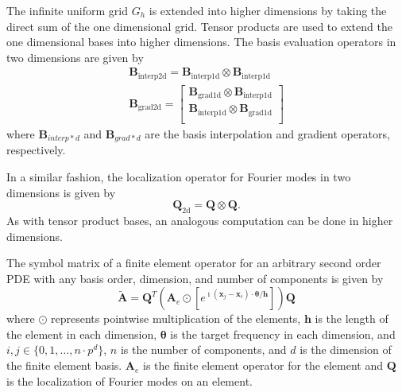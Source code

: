 \documentclass[review]{siamart190516}
\begin{document}
The infinite uniform grid $G_h$ is extended into higher dimensions by taking the direct sum of the one dimensional grid.
Tensor products are used to extend the one dimensional bases into higher dimensions.
The basis evaluation operators in two dimensions are given by
\begin{equation}
\begin{split}
\mathbf{B}_{\text{interp2d}} = \mathbf{B}_{\text{interp1d}} \otimes \mathbf{B}_{\text{interp1d}} \\
\mathbf{B}_{\text{grad2d}} =
\begin{bmatrix}
    \mathbf{B}_{\text{grad1d}} \otimes \mathbf{B}_{\text{interp1d}} \\
    \mathbf{B}_{\text{interp1d}} \otimes \mathbf{B}_{\text{grad1d}} \\
\end{bmatrix}
\end{split}
\end{equation}
where $\mathbf{B}_{interp*d}$ and $\mathbf{B}_{grad*d}$ are the basis interpolation and gradient operators, respectively.

In a similar fashion, the localization operator for Fourier modes in two dimensions is given by
\begin{equation}
\mathbf{Q}_{\text{2d}} = \mathbf{Q} \otimes \mathbf{Q}.
\end{equation}
As with tensor product bases, an analogous computation can be done in higher dimensions.

\begin{definition}
The symbol matrix of a finite element operator for an arbitrary second order PDE with any basis order, dimension, and number of components is given by
\begin{equation}\label{symbolhighorder}
\tilde{\mathbf{A}} = \mathbf{Q}^T \left( \mathbf{A}_e \odot \left[ e^{\imath \left( \mathbf{x}_j - \mathbf{x}_i \right) \cdot \boldsymbol{\theta} / \mathbf{h}} \right] \right) \mathbf{Q}
\end{equation}
where $\odot$ represents pointwise multiplication of the elements, $\mathbf{h}$ is the length of the element in each dimension, $\boldsymbol{\theta}$ is the target frequency in each dimension, and $i, j \in \lbrace 0, 1, \dots, n \cdot p^d \rbrace$, $n$ is the number of components, and $d$ is the dimension of the finite element basis.
$\mathbf{A}_e$ is the finite element operator for the element and $\mathbf{Q}$ is the localization of Fourier modes on an element.
\end{definition}\label{def:high_order_symbol}
\end{document}
